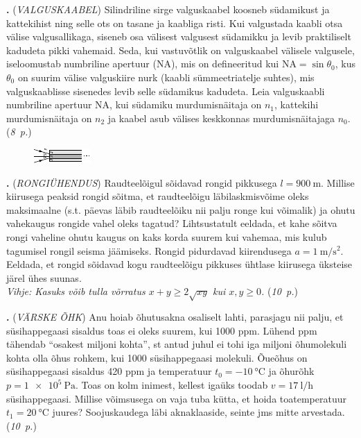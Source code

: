 \documentclass[11pt,a5paper]{article}
\newcommand{\numb}[1]{\vspace{5pt}\textbf{\large #1}}
\newcommand{\nimi}[1]{(\textsl{\small #1})}
\newcommand{\punktid}[1]{(\emph{#1~p.})}
\newcounter{ylesanne}
\newcommand{\yl}[1]{\addtocounter{ylesanne}{1}\numb{\theylesanne.} \nimi{#1} \newblock{}}
\newcommand{\autor}[1]{}%
\begin{document}
\yl{VALGUSKAABEL}
Silindriline sirge valguskaabel koosneb südamikust ja kattekihist ning selle ots on tasane ja kaabliga risti. Kui valgustada kaabli otsa välise valgusallikaga, siseneb osa välisest valgusest südamikku ja levib praktiliselt kadudeta pikki vahemaid. Seda, kui vastuvõtlik on valguskaabel välisele valgusele, iseloomustab numbriline apertuur (NA), mis on defineeritud kui $\text{NA} = \sin \theta_0$, kus $\theta_0$ on suurim välise valguskiire nurk (kaabli sümmeetriatelje suhtes), mis valguskaablisse sisenedes levib selle südamikus kadudeta. Leia valguskaabli numbriline apertuur NA, kui südamiku murdumisnäitaja on $n_1$, kattekihi murdumisnäitaja on $n_2$ ja kaabel asub välises keskkonnas murdumisnäitajaga $n_0$.
\punktid{8} \autor{Richard Luhtaru}
\begin{figure}[h]
    \centering
    \includegraphics[width=.7\linewidth]{valguskaabel_joonis.pdf}
\end{figure}



\yl{RONGIÜHENDUS}
Raudteelõigul sõidavad rongid pikkusega $l=\SI{900}{\m}$. Millise kiirusega peaksid rongid sõitma, et raudteelõigu läbilaskmisvõime oleks maksimaalne (s.t. päevas läbib raudteelõiku nii palju ronge kui võimalik) ja ohutu vahekaugus rongide vahel oleks tagatud? Lihtsustatult eeldada, et kahe sõitva rongi vaheline ohutu kaugus on kaks korda suurem kui vahemaa, mis kulub tagumisel rongil seisma jäämiseks. Rongid pidurdavad kiirendusega $a=\SI{1}{\m\per\s\squared}$. Eeldada, et rongid sõidavad kogu raudteelõigu pikkuses ühtlase kiirusega üksteise järel ühes suunas. \\
\textit{Vihje: Kasuks võib tulla võrratus $x+y \geq 2\sqrt{xy}$ kui $x, y \geq 0$.}
\punktid{10} \autor{Jonatan Kalmus}



\yl{VÄRSKE ÕHK}
Anu hoiab õhutusakna osaliselt lahti, parasjagu nii palju, et süsihappegaasi sisaldus toas ei oleks suurem, kui 1000 ppm. Lühend ppm tähendab ``osakest miljoni kohta'', st antud juhul ei tohi iga miljoni õhumolekuli kohta olla õhus rohkem, kui 1000 süsihappegaasi molekuli. Õueõhus on süsihappegaasi sisaldus 420 ppm ja temperatuur  $t_0=\SI{-10}{\celsius}$ ja õhurõhk $p=\SI{1e5}{\pascal}$. Toas on kolm inimest, kellest igaüks toodab $v=\SI{17}{\litre\per\hour}$  süsihappegaasi. Millise võimsusega on vaja tuba kütta, et hoida toatemperatuur $t_1=\SI{20}{\celsius}$ juures? Soojuskaudega läbi aknaklaaside, seinte jms mitte arvestada.
\punktid{10} \autor{Jaan Kalda}
\end{document}
